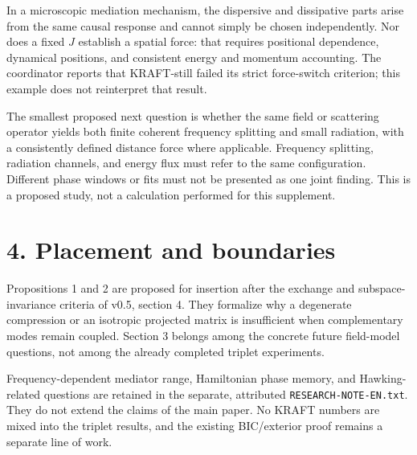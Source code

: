 \documentclass[a4paper,11pt]{article}
\begin{document}
In a microscopic mediation mechanism, the dispersive and dissipative
parts arise from the same causal response and cannot simply be chosen
independently. Nor does a fixed \(J\) establish a spatial force: that
requires positional dependence, dynamical positions, and consistent
energy and momentum accounting. The coordinator reports that
KRAFT-still failed its strict force-switch criterion; this example
does not reinterpret that result.

The smallest proposed next question is whether the same field or
scattering operator yields both finite coherent frequency splitting and
small radiation, with a consistently defined distance force where
applicable. Frequency splitting, radiation channels, and energy flux
must refer to the same configuration. Different phase windows or fits
must not be presented as one joint finding. This is a proposed study,
not a calculation performed for this supplement.

\section*{4. Placement and boundaries}
Propositions 1 and 2 are proposed for insertion after the exchange and
subspace-invariance criteria of v0.5, section 4. They formalize why a
degenerate compression or an isotropic projected matrix is insufficient
when complementary modes remain coupled.
Section 3 belongs among the concrete future field-model questions,
not among the already completed triplet experiments.

Frequency-dependent mediator range, Hamiltonian phase memory, and
Hawking-related questions are retained in the separate, attributed
\texttt{RESEARCH-NOTE-EN.txt}. They do not extend the claims of the main
paper. No KRAFT numbers are mixed into the triplet results, and the
existing BIC/exterior proof remains a separate line of work.
\end{document}
